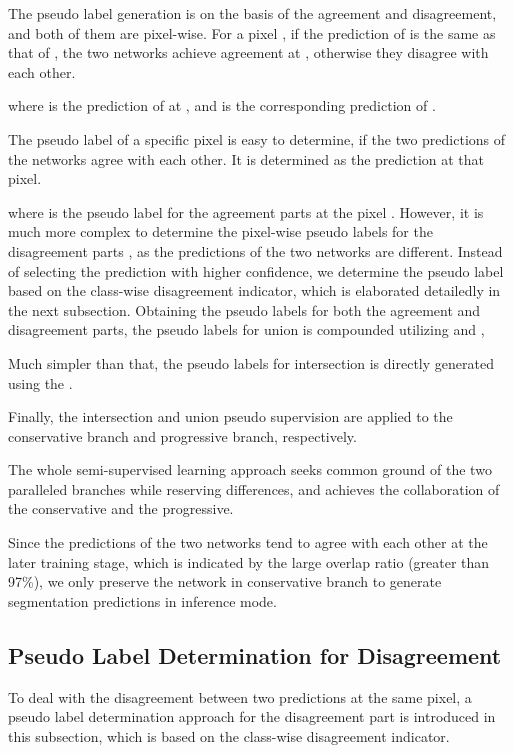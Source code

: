 \documentclass[journal]{IEEEtran}
\begin{document}
The pseudo label generation is on the basis of the agreement and disagreement, and both of them are pixel-wise. For a pixel , if the prediction of  is the 
same as that of , the two networks achieve agreement at , otherwise they disagree with each other.


where  is the prediction of  at , and  is the corresponding prediction of . 

The pseudo label of a specific pixel is easy to determine, if the two predictions of the networks agree with each other. It is determined as the prediction at that pixel.


where  is the pseudo label for the agreement parts  at the pixel . However, it is much more complex to determine the pixel-wise pseudo labels for the disagreement 
parts , as the predictions of the two networks are different. Instead of selecting the prediction with higher confidence, we determine the pseudo label based on the 
class-wise disagreement indicator, which is elaborated detailedly in the next subsection. Obtaining the pseudo labels for both the agreement and disagreement parts, the pseudo labels 
for union  is compounded utilizing  and ,


Much simpler than that, the pseudo labels for intersection  is directly generated using the . 

Finally, the intersection and union pseudo supervision are applied to the conservative branch and progressive branch, respectively.




The whole semi-supervised learning approach seeks common ground of the two paralleled branches while reserving differences, and achieves the collaboration of 
the conservative and the progressive.

Since the predictions of the two networks tend to agree with each other at the later training stage, which is indicated by the large overlap ratio (greater than 97\%), 
we only preserve the network in conservative branch to generate segmentation predictions in inference mode.

\subsection{Pseudo Label Determination for Disagreement}

To deal with the disagreement between two predictions at the same pixel, a pseudo label determination approach for the disagreement part is introduced in this subsection, 
which is based on the class-wise disagreement indicator.
\end{document}
